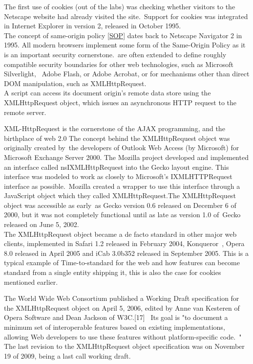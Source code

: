 \documentclass[a4paper,12pt]{paper}
\begin{document}
The first use of cookies (out of the labs) was checking whether visitors to the Netscape website had already visited the site.\
Support for cookies was integrated in Internet Explorer in version 2, released in October 1995.\\

The concept of same-origin policy  \ref{SOP} dates back to Netscape Navigator 2 in 1995. All modern browsers implement some form of the Same-Origin Policy as it is an important security cornerstone.\
are often extended to define roughly compatible security boundaries for other web technologies, such as Microsoft Silverlight, \
Adobe Flash, or Adobe Acrobat, or for mechanisms other than direct DOM manipulation, such as XMLHttpRequest.\\

A script can access its document origin’s remote data store using the XMLHttpRequest object, which issues an asynchronous HTTP request to the remote server.\

XML-HttpRequest is the cornerstone of the AJAX programming, and the birthplace of web 2.0 The concept behind the XMLHttpRequest object was originally created by\
the developers of Outlook Web Access (by Microsoft) for Microsoft Exchange Server 2000.
The Mozilla project developed and implemented an interface called nsIXMLHttpRequest into the Gecko layout engine.
This interface was modeled to work as closely to Microsoft's IXMLHTTPRequest interface as possible.\
Mozilla created a wrapper to use this interface through a JavaScript object which they called XMLHttpRequest.The XMLHttpRequest object was accessible as early\
as Gecko version 0.6 released on December 6 of 2000, but it was not completely functional until as late as version 1.0 of\
Gecko released on June 5, 2002. \\
The XMLHttpRequest object became a de facto standard in other major web clients, implemented in Safari 1.2 released in February 2004, Konqueror\
, Opera 8.0 released in April 2005 and iCab 3.0b352 released in September 2005. This is a typical example of Time-to-standard for the web and how features can become standard from a
single entity shipping it, this is also the case for cookies mentioned earlier.\

The World Wide Web Consortium published a Working Draft specification for the XMLHttpRequest object on April 5, 2006, 
edited by Anne van Kesteren of Opera Software and Dean Jackson of W3C.[17] \
Its goal is "to document a minimum set of interoperable features based on existing implementations, allowing Web developers to use these features without platform-specific code.\
" The last revision to the XMLHttpRequest object specification was on November 19 of 2009, being a last call working draft.\
\end{document}
